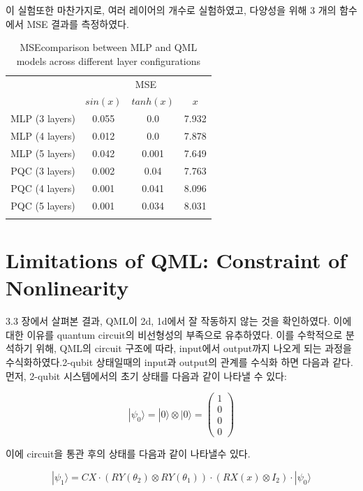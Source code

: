 이 실험또한 마찬가지로, 여러 레이어의 개수로 실험하였고, 다양성을 위해 3 개의 함수에서 MSE  결과를 측정하였다.

\begin{table}[ht]
    \centering
    \begin{tabular}{c|ccc}
    \Xhline{3\arrayrulewidth}
    \multirow{2}{*}{Layers} & \multicolumn{3}{c}{MSE} \\
    \cline{2-4}
    & $sin(x)$  & $tanh(x)$ & $x$ \\
    \hline
    MLP (3 layers) & 0.055 & 0.0 & 7.932 \\
    MLP (4 layers) & 0.012 & 0.0 & 7.878 \\
    MLP (5 layers) & 0.042 & 0.001 & 7.649 \\
    \hline
    PQC (3 layers) & 0.002 & 0.04 & 7.763 \\
    PQC (4 layers) & 0.001 & 0.041 & 8.096 \\
    PQC (5 layers) & 0.001 & 0.034 & 8.031 \\
    \Xhline{3\arrayrulewidth}
    \end{tabular}
    \caption{MSEcomparison between MLP and QML models across different layer configurations}
    \label{tab:mse_comparison}
\end{table}




\section{Limitations of QML: Constraint of Nonlinearity}

3.3 장에서 살펴본 결과, QML이 2d, 1d에서 잘 작동하지 않는 것을 확인하였다. 이에 대한 이유를 quantum circuit의 비선형성의 부족으로 유추하였다. 이를 수학적으로 분석하기 위해, QML의 circuit 구조에 따라, input에서 output까지 나오게 되는 과정을 수식화하였다.2-qubit 상태일때의 input과 output의 관계를 수식화 하면 다음과 같다.
먼저, 2-qubit 시스템에서의 초기 상태를 다음과 같이 나타낼 수 있다:

\[
|\psi_0\rangle = |0\rangle \otimes |0\rangle = \begin{pmatrix} 1 \\ 0 \\ 0 \\ 0 \end{pmatrix}
\]

이에  circuit을 통관 후의 상태를 다음과 같이 나타낼수 있다.

\[
|\psi_1\rangle = CX \cdot (RY(\theta_2) \otimes RY(\theta_1)) \cdot (RX(x) \otimes I_2) \cdot |\psi_0\rangle
\]

